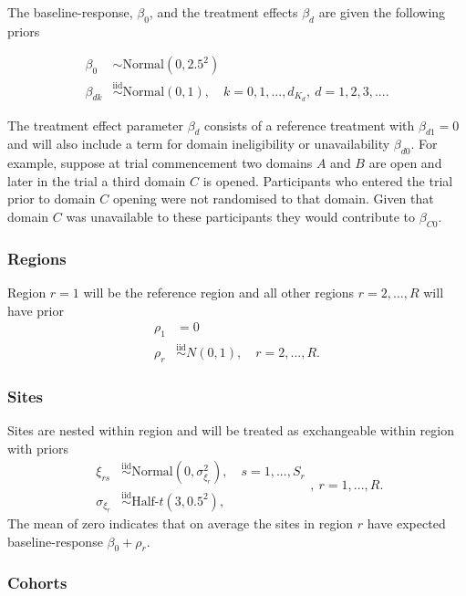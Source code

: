 \documentclass[
  11pt,
]{article}
\begin{document}
The baseline-response, \(\beta_0\), and the treatment effects \(\beta_d\) are given the following priors

\[
\begin{aligned}
\beta_0 &\sim \text{Normal}(0, 2.5^2) \\
\beta_{dk} &\overset{\text{iid}}{\sim} \text{Normal}(0, 1),\quad k=0,1,...,d_{K_d},\ d=1,2,3,....
\end{aligned}
\]

The treatment effect parameter \(\beta_d\) consists of a reference treatment with \(\beta_{d1}=0\) and will also include a term for domain ineligibility or unavailability \(\beta_{d0}\).
For example, suppose at trial commencement two domains \(A\) and \(B\) are open and later in the trial a third domain \(C\) is opened.
Participants who entered the trial prior to domain \(C\) opening were not randomised to that domain.
Given that domain \(C\) was unavailable to these participants they would contribute to \(\beta_{C0}\).

\hypertarget{regions}{%
\subsubsection{Regions}\label{regions}}

Region \(r=1\) will be the reference region and all other regions \(r=2,...,R\) will have prior
\[
\begin{aligned}
\rho_1 &= 0 \\
\rho_r &\overset{\text{iid}}{\sim} N(0, 1),\quad r=2,...,R.
\end{aligned}
\]

\hypertarget{sites}{%
\subsubsection{Sites}\label{sites}}

Sites are nested within region and will be treated as exchangeable within region with priors
\[
\begin{aligned}
\xi_{rs} &\overset{\text{iid}}{\sim} \text{Normal}\left(0, \sigma_{\xi_r}^2\right),\quad s=1,...,S_r\\
\sigma_{\xi_r} &\overset{\text{iid}}{\sim} \text{Half-}t(3,0.5^2), 
\end{aligned},\ r=1,...,R.
\]
The mean of zero indicates that on average the sites in region \(r\) have expected baseline-response \(\beta_0 + \rho_r\).

\hypertarget{cohorts}{%
\subsubsection{Cohorts}\label{cohorts}}
\end{document}
